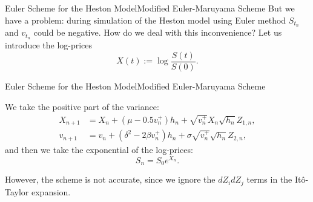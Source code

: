 \begin{frame}{Euler Scheme for the Heston Model}{Modified Euler-Maruyama Scheme}
    But we have a problem: during simulation of the Heston model using Euler method $S_{t_n}$ and $v_{t_n}$ could be negative. How do we deal with this inconvenience?
    Let us introduce the log-prices
    \begin{equation}
        X(t) := \log\frac{S(t)}{S(0)}.
    \end{equation}
\end{frame}

\begin{frame}{Euler Scheme for the Heston Model}{Modified Euler-Maruyama Scheme}
    
    We take the positive part of the variance:
    \begin{align}
        X_{n+1} & = X_n + (\mu - 0.5 v_n^+)h_n + \sqrt{v_n^+} X_n \sqrt{h_n} Z_{1,n}, \label{Euler:Heston:price:posmod}\\
        v_{n+1} & = v_n + \left(\delta^2 - 2\beta v_n^+\right) h_n + \sigma \sqrt{v_n^+} \sqrt{h_n} Z_{2,n}, \label{Euler:Heston:variance:posmod}
    \end{align}
    and then we take the exponential of the log-prices:
    \begin{equation}
        S_{n} = S_0 e^{X_{n}}.
    \end{equation}
    
    However, the scheme is not accurate, since we ignore the $dZ_idZ_j$ terms in the It\^o-Taylor expansion.
\end{frame}